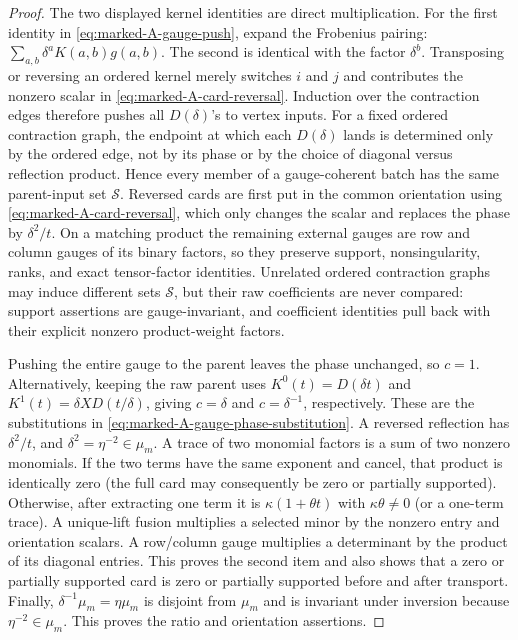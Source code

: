 \documentclass[11pt,letterpaper,onecolumn]{article}
\theoremstyle{plain}
\theoremstyle{definition}
\theoremstyle{remark}
\begin{document}
\begin{proof}
The two displayed kernel identities are direct multiplication.  For the
first identity in \cref{eq:marked-A-gauge-push}, expand the Frobenius pairing:
\(\sum_{a,b}\delta^aK(a,b)g(a,b)\). The second is identical with the
factor \(\delta^b\).  Transposing or reversing an ordered kernel merely
switches \(i\) and \(j\) and contributes the nonzero scalar in
  \cref{eq:marked-A-card-reversal}.  Induction over the contraction edges
  therefore pushes all \(D(\delta)\)'s to vertex inputs.  For a fixed
  ordered contraction graph, the endpoint at which each \(D(\delta)\) lands is
  determined only by the ordered edge, not by its phase or by the choice of
  diagonal versus reflection product.  Hence every member of a
  gauge-coherent batch has the same parent-input set \(\mathscr S\).  Reversed cards
  are first put in the common orientation using
  \cref{eq:marked-A-card-reversal}, which only changes the scalar
  and replaces the phase by \(\delta^2/t\).  On a matching product the
  remaining external gauges are row and column gauges of its binary
  factors, so they preserve support, nonsingularity, ranks, and exact
  tensor-factor identities.  Unrelated ordered contraction graphs may induce
  different sets \(\mathscr S\), but their raw coefficients are never compared:
  support assertions are gauge-invariant, and coefficient identities pull
  back with their explicit nonzero product-weight factors.

Pushing the entire gauge to the parent leaves the phase unchanged, so
\(c=1\).  Alternatively, keeping the raw parent uses
\(K^0(t)=D(\delta t)\) and \(K^1(t)=\delta XD(t/\delta)\), giving
\(c=\delta\) and \(c=\delta^{-1}\), respectively.  These are the
substitutions in \cref{eq:marked-A-gauge-phase-substitution}. A reversed reflection has
\(\delta^2/t\), and \(\delta^2=\eta^{-2}\in \mu_m\).  A trace of two monomial
factors is a sum of two nonzero monomials.  If the two terms have the same
exponent and cancel, that product is identically zero (the full card may
consequently be zero or partially supported). Otherwise, after
extracting one term it is \(\kappa(1+\theta t)\) with
\(\kappa\theta\ne0\) (or a one-term trace).  A unique-lift
fusion multiplies a selected minor by the nonzero entry and orientation
scalars. A row/column gauge multiplies a determinant by the product of its
diagonal entries.  This proves the second item and also shows that a zero
or partially supported card is zero or partially supported before and after transport.
Finally, \(\delta^{-1}\mu_m=\eta \mu_m\) is disjoint from \(\mu_m\) and is invariant
under inversion because \(\eta^{-2}\in \mu_m\).  This proves the ratio and
orientation assertions.
\end{proof}
\end{document}
